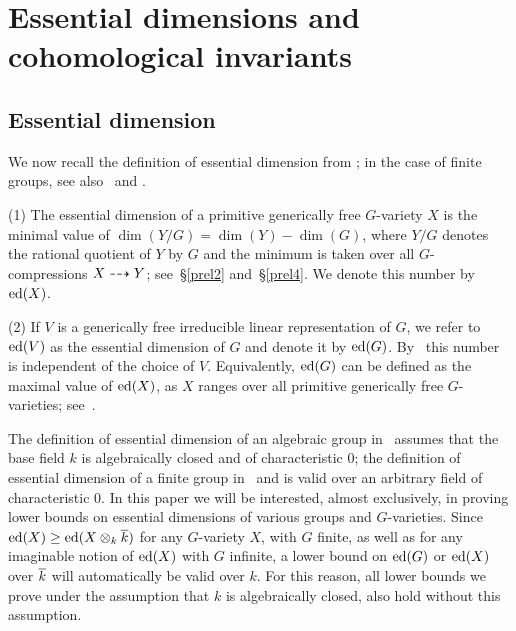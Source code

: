 \section{Essential dimensions and cohomological invariants}

\subsection*{Essential dimension}

We now recall the definition of essential dimension from \cite{r2};
in the case of finite groups, see also~\cite{br1} and \cite{br2}.

\begin{defn} \label{def.ed}
(1) The essential dimension of a primitive generically free $G$-variety 
$X$ is the minimal value of $\dim(Y/G) = \dim(Y) - \dim(G)$, where
$Y/G$ denotes the rational quotient of $Y$ by $G$ 
and the minimum is taken over all $G$-compressions $X \dasharrow Y$;
see~\S\ref{prel2} and~\S\ref{prel4}. We denote this number by $\operatorname{ed}(X)$.  

\smallskip
(2) If $V$ is a generically free irreducible linear 
representation of $G$, we refer to $\operatorname{ed}(V)$ as the essential 
dimension of $G$ and denote it by $\operatorname{ed}(G)$. By~\cite[Theorem~3.4]{r2} 
this number is independent of the choice of $V$. 
Equivalently, $\operatorname{ed}(G)$ can be defined as the maximal value of $\operatorname{ed}(X)$, 
as $X$ ranges over all primitive generically free $G$-varieties; 
see~\cite[Section~3.2]{r2}.
\end{defn}

\begin{remark} \label{rem6.05} The definition of essential dimension 
of an algebraic group
in~\cite{r2} assumes that the base field $k$ is algebraically closed
and of characteristic 0;
the definition of essential dimension of a finite group in~\cite{br1} 
and \cite{br2} is valid over an arbitrary field of characteristic 0.
In this paper we will be interested, almost exclusively,
in proving lower bounds on essential dimensions of various groups 
and $G$-varieties.  Since $\operatorname{ed}(X) \geq \operatorname{ed}(X \otimes_k \overline k)$ 
for any $G$-variety $X$, with $G$ finite, as well as for any imaginable 
notion of $\operatorname{ed}(X)$ with $G$ infinite, a lower bound on $\operatorname{ed}(G)$ or
$\operatorname{ed}(X)$ over $\overline k$ will automatically be valid over $k$.
For this reason, all lower bounds we prove under the assumption that $k$ is
algebraically closed, also hold without this assumption.
\end{remark}

